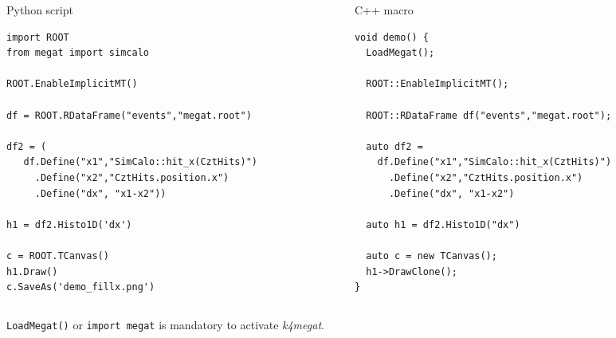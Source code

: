 \documentclass[11pt,t,aspectratio=169]{beamer}
\begin{document}
\begin{frame}
  \begin{columns}[t]
    \begin{column}{0.48\textwidth}
      \begin{block}{Python script}
\begin{verbatim}
import ROOT
from megat import simcalo

ROOT.EnableImplicitMT()

df = ROOT.RDataFrame("events","megat.root")

df2 = (
   df.Define("x1","SimCalo::hit_x(CztHits)")
     .Define("x2","CztHits.position.x")
     .Define("dx", "x1-x2"))
        
h1 = df2.Histo1D('dx')

c = ROOT.TCanvas()
h1.Draw()
c.SaveAs('demo_fillx.png')
\end{verbatim}
      \end{block}
    \end{column}

    \begin{column}{0.48\textwidth}
      \begin{block}{C++ macro}
\begin{verbatim}
void demo() {
  LoadMegat();

  ROOT::EnableImplicitMT();

  ROOT::RDataFrame df("events","megat.root");

  auto df2 =
    df.Define("x1","SimCalo::hit_x(CztHits)")
      .Define("x2","CztHits.position.x")
      .Define("dx", "x1-x2")

  auto h1 = df2.Histo1D("dx")

  auto c = new TCanvas();
  h1->DrawClone();
}
\end{verbatim}
      \end{block}
    \end{column}
  \end{columns}

  \vfill
\texttt{LoadMegat()} or \texttt{import megat} is mandatory to activate \textit{k4megat}. 
\end{frame}
\end{document}
